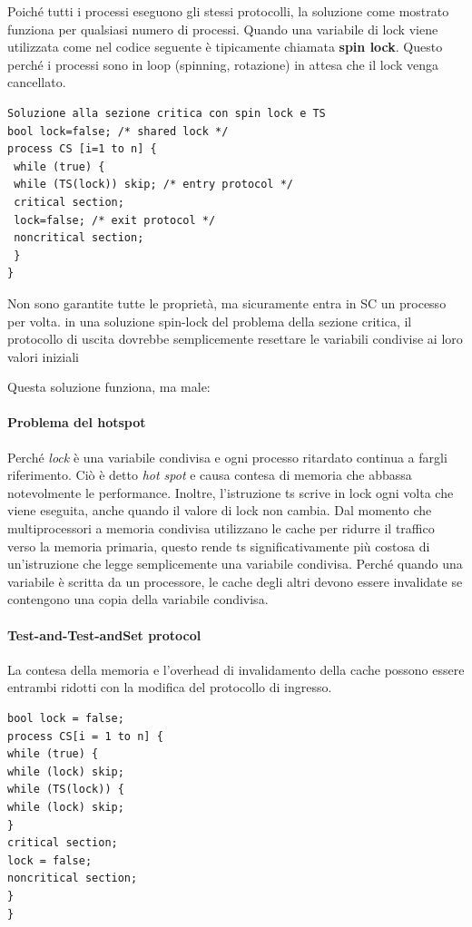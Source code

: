 \documentclass[10pt,a4paper]{article}
\begin{document}
Poiché tutti i processi eseguono gli stessi protocolli, la soluzione come mostrato funziona per qualsiasi numero di processi. Quando una variabile di lock viene utilizzata come nel codice seguente è tipicamente chiamata \textbf{spin lock}. Questo perché i processi sono in loop (spinning, rotazione) in attesa che il lock venga cancellato. 

\begin{verbatim}
Soluzione alla sezione critica con spin lock e TS
bool lock=false; /* shared lock */
process CS [i=1 to n] {
 while (true) {
 while (TS(lock)) skip; /* entry protocol */
 critical section;
 lock=false; /* exit protocol */
 noncritical section;
 }
} 
\end{verbatim}

Non sono garantite tutte le proprietà, ma sicuramente entra in SC un processo per volta.
in una soluzione spin-lock del problema della sezione critica, il protocollo di uscita dovrebbe semplicemente resettare le variabili condivise ai loro valori iniziali

Questa soluzione funziona, ma male:

\paragraph{Problema del hotspot}
Perché \textit{lock} è una variabile condivisa e ogni processo ritardato continua a fargli riferimento. Ciò è detto \textit{hot spot} e causa contesa di memoria che abbassa notevolmente le performance.
Inoltre, l'istruzione ts scrive in lock ogni volta che viene eseguita, anche quando il valore di lock non cambia. Dal momento che multiprocessori a memoria condivisa utilizzano le cache per ridurre il traffico verso la memoria primaria, questo rende ts significativamente più costosa di un'istruzione che legge semplicemente una variabile condivisa. Perché quando una variabile è scritta da un processore, le cache degli altri devono essere invalidate se contengono una copia della variabile condivisa.

\paragraph{Test-and-Test-andSet protocol}
La contesa della memoria e l'overhead di invalidamento della cache possono essere entrambi ridotti con la modifica del protocollo di ingresso.
\begin{verbatim}
bool lock = false;
process CS[i = 1 to n] {
while (true) {
while (lock) skip;
while (TS(lock)) {
while (lock) skip;
}
critical section;
lock = false;
noncritical section;
}
}
\end{verbatim}
\end{document}
